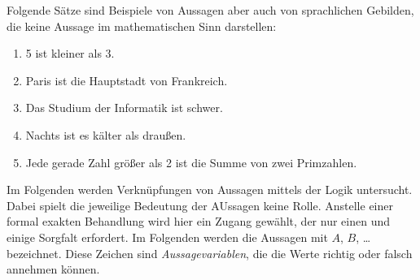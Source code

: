 \begin{beispiel}
Folgende Sätze sind Beispiele von Aussagen aber auch von sprachlichen Gebilden, die keine Aussage im mathematischen Sinn darstellen:
\begin{enumerate}
\item 5 ist kleiner als 3.
\item Paris ist die Hauptstadt von Frankreich.
\item Das Studium der Informatik ist schwer.
\item Nachts ist es kälter als draußen.
\item Jede gerade Zahl größer als 2 ist die Summe von zwei Primzahlen.
\end{enumerate}
\end{beispiel}

Im Folgenden werden Verknüpfungen von Aussagen mittels der Logik untersucht. Dabei spielt die jeweilige Bedeutung der AUssagen keine Rolle. Anstelle einer formal exakten Behandlung wird hier ein  Zugang gewählt, der nur einen  und einige Sorgfalt erfordert. Im Folgenden werden die Aussagen mit $A$, $B$, \dots bezeichnet. Diese Zeichen sind \emph{Aussagevariablen}, die die Werte richtig oder falsch annehmen können.

